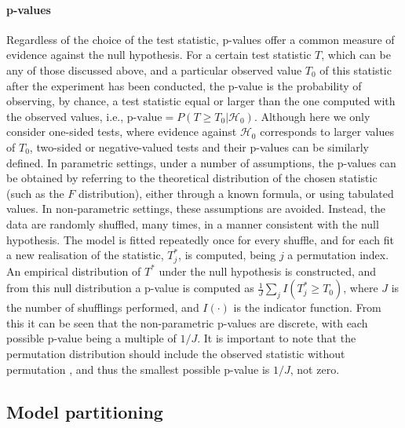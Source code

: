 \paragraph{p-values} Regardless of the choice of the test statistic, p-values offer a common measure of evidence against the null hypothesis. For a certain test statistic $T$, which can be any of those discussed above, and a particular observed value $T_{0}$ of this statistic after the experiment has been conducted, the p-value is the probability of observing, by chance, a test statistic equal or larger than the one computed with the observed values, i.e., $\text{p-value}=P(T \geqslant T_{0} | \mathcal{H}_{0})$. Although here we only consider one-sided tests, where evidence against $\mathcal{H}_{0}$ corresponds to larger values of $T_{0}$, two-sided or negative-valued tests and their p-values can be similarly defined. In parametric settings, under a number of assumptions, the p-values can be obtained by referring to the theoretical distribution of the chosen statistic (such as the $F$ distribution), either through a known formula, or using tabulated values. In non-parametric settings, these assumptions are avoided. Instead, the data are randomly shuffled, many times, in a manner consistent with the null hypothesis. The model is fitted repeatedly once for every shuffle, and for each fit a new realisation of the statistic, $T_{j}^{*}$, is computed, being $j$ a permutation index. An empirical distribution of $T^{*}$ under the null hypothesis is constructed, and from this null distribution a p-value is computed as $\frac{1}{J}\sum_{j}I(T^{*}_j \geqslant T_{0})$, where $J$ is the number of shufflings performed, and $I(\cdot)$ is the indicator function. From this it can be seen that the non-parametric p-values are discrete, with each possible p-value being a multiple of $1/J$. It is important to note that the permutation distribution should include the observed statistic without permutation \citep{Edgington1969, Phipson2010}, and thus the smallest possible p-value is $1/J$, not zero.

\subsection{Model partitioning}
\label{sec:partitioning}

